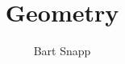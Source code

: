 \documentclass{article}
\author{Bart Snapp}
\title{Geometry}
\begin{document}
\begin{abstract}
\end{abstract}
\maketitle
\end{document}
